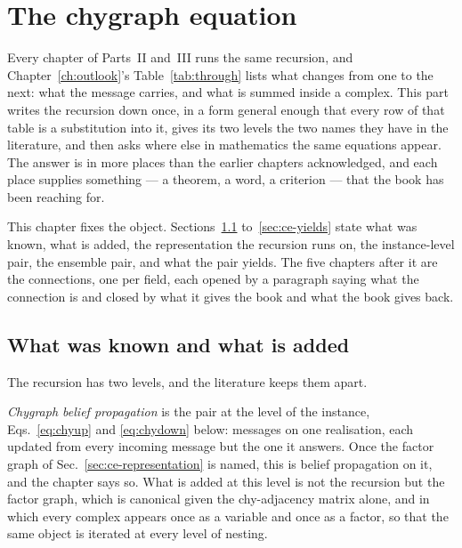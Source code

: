 \chapter{The chygraph equation}
\label{ch:chyequation}


Every chapter of Parts~II and~III runs the same recursion, and
Chapter~\ref{ch:outlook}'s Table~\ref{tab:through} lists what changes from one
to the next: what the message carries, and what is summed inside a complex.
This part writes the recursion down once, in a form general enough that every
row of that table is a substitution into it, gives its two levels the two
names they have in the literature, and then asks where else in mathematics the
same equations appear. The answer is in more places than the earlier chapters
acknowledged, and each place supplies something --- a theorem, a word, a
criterion --- that the book has been reaching for.

This chapter fixes the object. Sections~\ref{sec:ce-known}
to~\ref{sec:ce-yields} state what was known, what is added, the representation
the recursion runs on, the instance-level pair, the ensemble pair, and what
the pair yields. The five chapters after it are the connections, one per
field, each opened by a paragraph saying what the connection is and closed by
what it gives the book and what the book gives back.

\section{What was known and what is added}
\label{sec:ce-known}

The recursion has two levels, and the literature keeps them apart.

\emph{Chygraph belief propagation} is the pair at the level of the
instance, Eqs.~\eqref{eq:chyup} and \eqref{eq:chydown} below: messages on one
realisation, each updated from every incoming message but the one it answers.
Once the factor graph of Sec.~\ref{sec:ce-representation} is named, this is
belief propagation on it, and the chapter says so. What is added at this level
is not the recursion but the factor graph, which is canonical given the
chy-adjacency matrix alone, and in which every complex appears once as a
variable and once as a factor, so that the same object is iterated at every
level of nesting.

